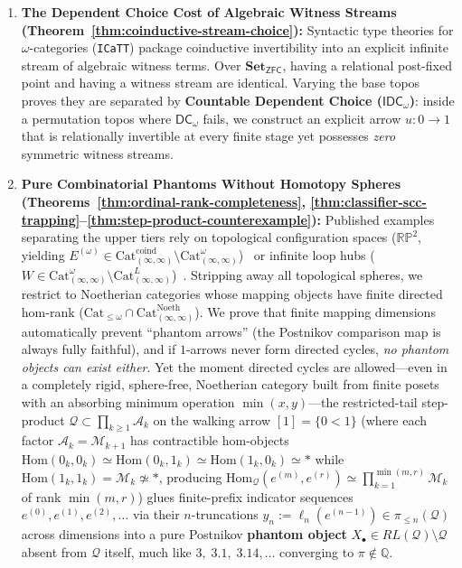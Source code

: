 \documentclass[10pt,twoside,openright]{book}
\theoremstyle{crmplain}
\theoremstyle{crmdef}
\theoremstyle{crmremark}
\begin{document}
\begin{enumerate}
  \item \textbf{The Dependent Choice Cost of Algebraic Witness Streams (Theorem~\ref{thm:coinductive-stream-choice}):} Syntactic type theories for $\omega$-categories (\texttt{ICaTT}) package coinductive invertibility into an explicit infinite stream of algebraic witness terms. Over $\mathbf{Set}_{\mathsf{ZFC}}$, having a relational post-fixed point and having a witness stream are identical. Varying the base topos proves they are separated by \textbf{Countable Dependent Choice ($\mathsf{IDC}_\omega$)}: inside a permutation topos where $\mathsf{DC}_\omega$ fails, we construct an explicit arrow $u : 0 \to 1$ that is relationally invertible at every finite stage yet possesses \emph{zero} symmetric witness streams.
  \item \textbf{Pure Combinatorial Phantoms Without Homotopy Spheres (Theorems~\ref{thm:ordinal-rank-completeness}, \ref{thm:classifier-scc-trapping}--\ref{thm:step-product-counterexample}):} Published examples separating the upper tiers rely on topological configuration spaces ($\mathbb{R}\mathbb{P}^2$, yielding $E^{(\omega)} \in \mathrm{Cat}^{\mathrm{coind}}_{(\infty,\infty)} \setminus \mathrm{Cat}^\omega_{(\infty,\infty)}$)~\cite{HenryLoubaton25,ORW26} or infinite loop hubs ($W \in \mathrm{Cat}^\omega_{(\infty,\infty)} \setminus \mathrm{Cat}^L_{(\infty,\infty)}$)~\cite{ORW26}. Stripping away all topological spheres, we restrict to Noetherian categories whose mapping objects have finite directed hom-rank ($\mathrm{Cat}_{\le \omega} \cap \mathrm{Cat}^{\mathrm{Noeth}}_{(\infty,\infty)}$). We prove that finite mapping dimensions automatically prevent ``phantom arrows'' (the Postnikov comparison map is always fully faithful), and if $1$-arrows never form directed cycles, \emph{no phantom objects can exist either}. Yet the moment directed cycles are allowed---even in a completely rigid, sphere-free, Noetherian category built from finite posets with an absorbing minimum operation $\min(x, y)$---the restricted-tail step-product $\mathcal{Q} \subset \prod_{k \ge 1} \mathcal{A}_k$ on the walking arrow $[1] = \{0 < 1\}$ (where each factor $\mathcal{A}_k = \mathcal{M}_{k+1}$ has contractible hom-objects $\mathrm{Hom}(0_k, 0_k) \simeq \mathrm{Hom}(0_k, 1_k) \simeq \mathrm{Hom}(1_k, 0_k) \simeq *$ while $\mathrm{Hom}(1_k, 1_k) = \mathcal{M}_k \not\simeq *$, producing $\mathrm{Hom}_{\mathcal{Q}}(e^{(m)}, e^{(r)}) \simeq \prod_{k=1}^{\min(m, r)} \mathcal{M}_k$ of rank $\min(m, r)$) glues finite-prefix indicator sequences $e^{(0)}, e^{(1)}, e^{(2)}, \dots$ via their $n$-truncations $y_n := \ell_n(e^{(n-1)}) \in \pi_{\le n}(\mathcal{Q})$ across dimensions into a pure Postnikov \textbf{phantom object} $X_\bullet \in RL(\mathcal{Q}) \setminus \mathcal{Q}$ absent from $\mathcal{Q}$ itself, much like $3,\; 3.1,\; 3.14,\dots$ converging to $\pi \notin \mathbb{Q}$.

\end{enumerate}
\end{document}
